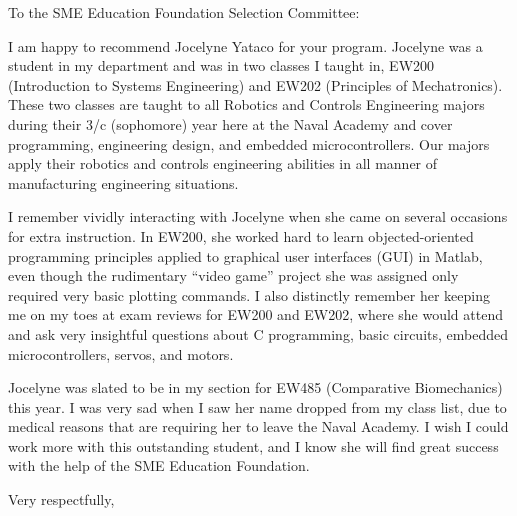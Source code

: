 \documentclass[12pt]{wrceletter}
\date{\today}
\begin{document}
\begin{letter}{%
}

\opening{To the SME Education Foundation Selection Committee:}
\raggedright %
\setlength{\parindent}{15pt} %

I am happy to recommend Jocelyne Yataco for your program. Jocelyne was a student in my department and was in two classes I taught in, EW200 (Introduction to Systems Engineering) and EW202 (Principles of Mechatronics). These two classes are taught to all Robotics and Controls Engineering majors during their 3/c (sophomore) year here at the Naval Academy and cover programming, engineering design, and embedded microcontrollers. Our majors apply their robotics and controls engineering abilities in all manner of manufacturing engineering situations.   

I remember vividly interacting with Jocelyne when she came on several occasions for extra instruction. In EW200, she worked hard to learn objected-oriented programming principles applied to graphical user interfaces (GUI) in Matlab, even though the rudimentary ``video game'' project she was assigned only required very basic plotting commands. I also distinctly remember her keeping me on my toes at exam reviews for EW200 and EW202, where she would attend and ask very insightful questions about C programming, basic circuits, embedded microcontrollers, servos, and motors. 

Jocelyne was slated to be in my section for EW485 (Comparative Biomechanics) this year. I was very sad when I saw her name dropped from my class list, due to medical reasons that are requiring her to leave the Naval Academy. I wish I could work more with this outstanding student, and I know she will find great success with the help of the SME Education Foundation.



\closing{Very respectfully,} %

\end{letter}
\end{document}
